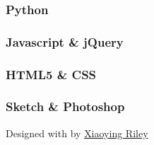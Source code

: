\documentclass[
]{article}
\begin{document}
\hypertarget{python}{%
\subsubsection{Python}\label{python}}

\hypertarget{javascript-jquery}{%
\subsubsection{Javascript \& jQuery}\label{javascript-jquery}}

\hypertarget{html5-css}{%
\subsubsection{HTML5 \& CSS}\label{html5-css}}

\hypertarget{sketch-photoshop}{%
\subsubsection{Sketch \& Photoshop}\label{sketch-photoshop}}

{Designed with \emph{} by \href{http://themes.3rdwavemedia.com}{Xiaoying
Riley}}
\end{document}
